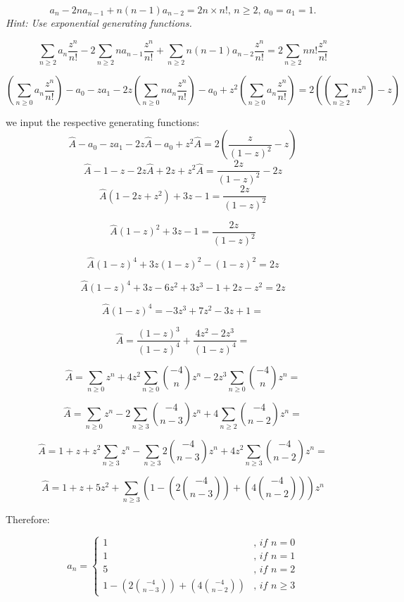 \documentclass[
]{article}
\begin{document}
\[
a_n - 2 n a_{n-1} + n (n-1) a_{n-2} = 2n \times n! \textit{, } n \geq 2 \textit{, } a_0 = a_1 = 1.
\] \emph{Hint: Use exponential generating functions.}

\[
\sum_{ n \geq 2} a_n \frac{z^n}{n!}  - 2 \sum_{ n \geq 2} n a_{n-1} \frac{z^n}{n!} + \sum_{ n \geq 2} n (n-1) a_{n-2} \frac{z^n}{n!} = 2 \sum_{ n \geq 2} n  n! \frac{z^n}{n!} 
\]

\[
(\sum_{ n \geq 0} a_n \frac{z^n}{n!}) - a_0 - za_1  - 2z (\sum_{ n \geq 0} n a_{n} \frac{z^n}{n!}) - a_0 + z^2 (\sum_{ n \geq 0} a_{n} \frac{z^n}{n!}) = 2 ((\sum_{ n \geq 2} n z^n ) - z)
\]

we input the respective generating functions: \[
\hat{A} - a_0 - za_1  - 2z \hat{A} - a_0 + z^2 \hat{A} = 2 \left( \frac{z}{(1-z)^2}  - z \right)
\] \[
\hat{A} - 1 - z  - 2z \hat{A}  + 2z + z^2 \hat{A} = \frac{2z}{(1-z)^2}  - 2z
\] \[
\hat{A} (1-2z+z^2) + 3z - 1 = \frac{2z}{(1-z)^2}
\]

\[
\hat{A} (1-z)^2 + 3z - 1 = \frac{2z}{(1-z)^2}
\]

\[
\hat{A} (1-z)^4 + 3z(1-z)^2 - (1-z)^2 = 2z
\]

\[
\hat{A} (1-z)^4 + 3z - 6z^2 + 3z^3 - 1 + 2z -z^2 = 2z
\]

\[
\hat{A} (1-z)^4 = -3z^3 + 7z^2 -3z + 1 =
\]

\[
\hat{A} = \frac{(1-z)^3}{(1-z)^4} + \frac{4z^2 - 2z^3}{(1-z)^4} =
\]

\[
\hat{A} = \sum_{n \geq 0} z^n + 4z^2 \sum_{n \geq 0} \binom{-4}{n} z^n- 2z^3 \sum_{n \geq 0} \binom{-4}{n} z^n =
\]

\[
\hat{A} = \sum_{n \geq 0} z^n - 2 \sum_{n \geq 3} \binom{-4}{n-3} z^n + 4 \sum_{n \geq 2} \binom{-4}{n-2} z^n =
\]

\[
\hat{A} = 1 + z + z^2 \sum_{n \geq 3} z^n - \sum_{n \geq 3} 2\binom{-4}{n-3} z^n + 4z^2 \sum_{n \geq 3} \binom{-4}{n-2} z^n =
\]

\[
\hat{A} = 1 + z + 5z^2 +  \sum_{n \geq 3} (1 -  (2\binom{-4}{n-3}) + (4 \binom{-4}{n-2})) z^n
\]

Therefore:

\[
a_n = \begin{cases}
1  &\textit{, if } n = 0 \\
1  &\textit{, if } n = 1 \\
5  &\textit{, if } n = 2 \\
1 -  (2\binom{-4}{n-3}) + (4 \binom{-4}{n-2})  &\textit{, if } n \geq 3 
\end{cases}
\]
\end{document}
